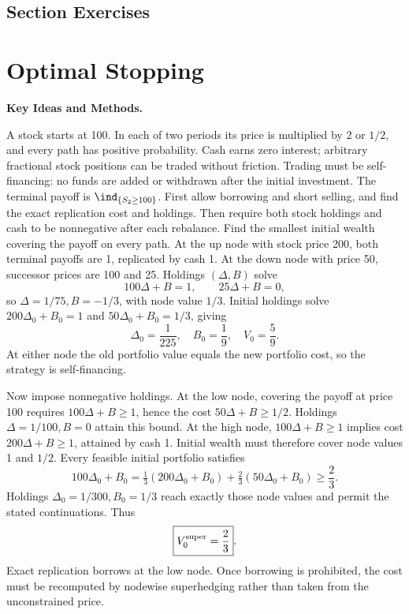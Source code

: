 \par{}
\subsection*{Section Exercises}



\section{Optimal Stopping}
\noindent\textbf{Key Ideas and Methods.}\enspace



A stock starts at 100. In each of two periods its price is multiplied by 2 or $1/2$, and every path has positive probability. Cash earns zero interest; arbitrary fractional stock positions can be traded without friction. Trading must be self-financing: no funds are added or withdrawn after the initial investment. The terminal payoff is $\ind_{\{S_2\ge100\}}$. First allow borrowing and short selling, and find the exact replication cost and holdings. Then require both stock holdings and cash to be nonnegative after each rebalance. Find the smallest initial wealth covering the payoff on every path.
\solution At the up node with stock price 200, both terminal payoffs are 1, replicated by cash 1. At the down node with price 50, successor prices are 100 and 25. Holdings $(\Delta,B)$ solve
\[
 100\Delta+B=1,\qquad25\Delta+B=0,
\]
so $\Delta=1/75,B=-1/3$, with node value $1/3$. Initial holdings solve $200\Delta_0+B_0=1$ and $50\Delta_0+B_0=1/3$, giving
\[
 \boxed{\Delta_0=\frac1{225},\quad B_0=\frac19,\quad V_0=\frac59}.
\]
At either node the old portfolio value equals the new portfolio cost, so the strategy is self-financing.

Now impose nonnegative holdings. At the low node, covering the payoff at price 100 requires $100\Delta+B\ge1$, hence the cost $50\Delta+B\ge1/2$. Holdings $\Delta=1/100,B=0$ attain this bound. At the high node, $100\Delta+B\ge1$ implies cost $200\Delta+B\ge1$, attained by cash 1. Initial wealth must therefore cover node values 1 and $1/2$. Every feasible initial portfolio satisfies
\[
 100\Delta_0+B_0
 =\tfrac13(200\Delta_0+B_0)+\tfrac23(50\Delta_0+B_0)
 \ge\frac23.
\]
Holdings $\Delta_0=1/300,B_0=1/3$ reach exactly those node values and permit the stated continuations. Thus
\[
 \boxed{V_0^{\rm super}=\frac23}.
\]
\insight Exact replication borrows at the low node. Once borrowing is prohibited, the cost must be recomputed by nodewise superhedging rather than taken from the unconstrained price.


